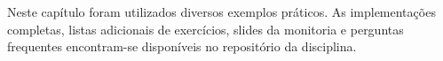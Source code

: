 \begin{tcolorbox}[title=Material Complementar]

Neste capítulo foram utilizados diversos exemplos práticos. As implementações completas, listas adicionais de exercícios, slides da monitoria e perguntas frequentes encontram-se disponíveis no repositório da disciplina.

\end{tcolorbox}



